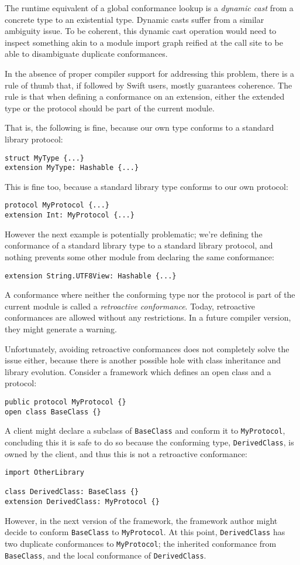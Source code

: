 \documentclass[a4paper,headsepline,bibliography=totoc,toc=flat,fleqn,twoside=semi]{scrbook}
\theoremstyle{definition}
\theoremstyle{definition}
\theoremstyle{definition}
\begin{document}
The runtime equivalent of a global conformance lookup is a \emph{dynamic cast} from a concrete type to an existential type. Dynamic casts suffer from a similar ambiguity issue. To be coherent, this dynamic cast operation would need to inspect something akin to a module import graph reified at the call site to be able to disambiguate duplicate conformances.

In the absence of proper compiler support for addressing this problem, there is a rule of thumb that, if followed by Swift users, mostly guarantees coherence. The rule is that when defining a conformance on an extension, either the extended type or the protocol should be part of the current module.

That is, the following is fine, because our own type conforms to a standard library protocol:
\begin{Verbatim}
struct MyType {...}
extension MyType: Hashable {...}
\end{Verbatim}
This is fine too, because a standard library type conforms to our own protocol:
\begin{Verbatim}
protocol MyProtocol {...}
extension Int: MyProtocol {...}
\end{Verbatim}

However the next example is potentially problematic; we're defining the conformance of a standard library type to a standard library protocol, and nothing prevents some other module from declaring the same conformance:
\begin{Verbatim}
extension String.UTF8View: Hashable {...}
\end{Verbatim}

A conformance where neither the conforming type nor the protocol is part of the current module is called a \emph{retroactive conformance}. Today, retroactive conformances are allowed without any restrictions. In a future compiler version, they might generate a warning.

Unfortunately, avoiding retroactive conformances does not completely solve the issue either, because there is another possible hole with class inheritance and library evolution. Consider a framework which defines an open class and a protocol:
\begin{Verbatim}
public protocol MyProtocol {}
open class BaseClass {}
\end{Verbatim}
A client might declare a subclass of \texttt{BaseClass} and conform it to \texttt{MyProtocol}, concluding this it is safe to do so because the conforming type, \texttt{DerivedClass}, is owned by the client, and thus this is not a retroactive conformance:
\begin{Verbatim}
import OtherLibrary

class DerivedClass: BaseClass {}
extension DerivedClass: MyProtocol {}
\end{Verbatim}
However, in the next version of the framework, the framework author might decide to conform \texttt{BaseClass} to \texttt{MyProtocol}. At this point, \texttt{DerivedClass} has two duplicate conformances to \texttt{MyProtocol}; the inherited conformance from \texttt{BaseClass}, and the local conformance of \texttt{DerivedClass}.
\end{document}

